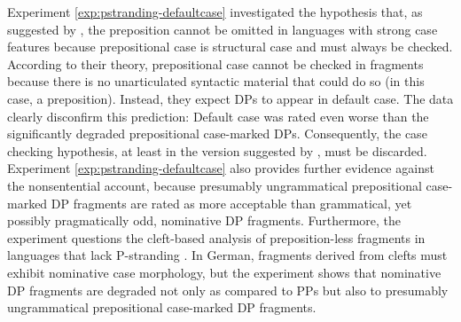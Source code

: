 Experiment \ref{exp:pstranding-defaultcase} investigated the hypothesis that, as suggested by \citet{barton.progovac2005}, the preposition cannot be omitted in languages with strong case features because prepositional case is structural case and must always be checked. According to their theory, prepositional case cannot be checked in fragments because there is no unarticulated syntactic material that could do so (in this case, a preposition). Instead, they expect DPs to appear in default case. The data clearly disconfirm this prediction: Default case was rated even worse than the significantly degraded prepositional case-marked DPs. Consequently, the case checking hypothesis, at least in the version suggested by \citet{barton.progovac2005}, must be discarded. Experiment \ref{exp:pstranding-defaultcase} also provides further evidence against the nonsentential account, because presumably ungrammatical prepositional case-marked DP fragments are rated as more acceptable than grammatical, yet possibly pragmatically odd, nominative DP fragments. Furthermore, the experiment questions the cleft-based analysis of preposition-less fragments in languages that lack P-stranding \citep{szczegielniak2008, rodrigues.etal2009}. In German, fragments derived from clefts must exhibit nominative case morphology, but the experiment shows that nominative DP fragments are degraded not only as compared to PPs but also to presumably ungrammatical prepositional case-marked DP fragments.

